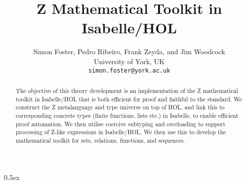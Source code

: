 \documentclass[11pt,a4paper]{article}
\begin{document}
\title{Z Mathematical Toolkit in Isabelle/HOL}
\author{Simon Foster, Pedro Ribeiro, Frank Zeyda, and Jim Woodcock \\[.5ex] University of York, UK \\[2ex] \texttt{\small simon.foster@york.ac.uk}}
\maketitle

\begin{abstract}
\noindent The objective of this theory development is an implementation of the Z mathematical 
toolkit in Isabelle/HOL that is both efficient for proof and faithful to the standard.
We construct the Z metalanguage and type universe on top of HOL, and link this to
corresponding concrete types (finite functions, lists etc.) in Isabelle, to enable
efficient proof automation. We then utilise coercive subtyping and overloading to
support processing of Z-like expressions in Isabelle/HOL. We then use this to develop
the mathematical toolkit for sets, relations, functions, and sequences.
\end{abstract}

\tableofcontents
\newpage

\parindent 0pt\parskip 0.5ex





\end{document}
